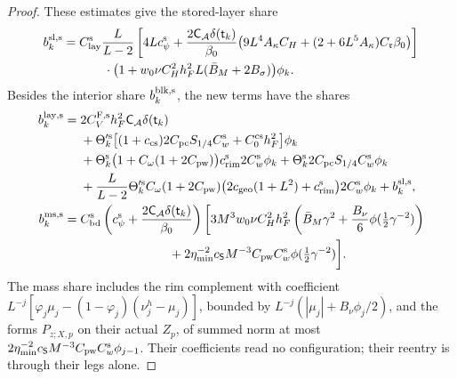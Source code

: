 \documentclass[11pt,letterpaper,reqno]{amsart}
\theoremstyle{definition}
\theoremstyle{remark}
\begin{document}
\begin{proof}
These estimates give the stored-layer share
\[
\begin{split}
 b_k^{\rm sl,s}={}&C_{\rm lay}^{\rm s}\frac L{L-2}
 \left[4Lc_\psi^{\rm s}
 +\frac{2\mathsf C_{\mathcal A}\delta(\mathsf t_k)}{\beta_0}
  \bigl(9L^4A_\kappa C_H+
           (2+6L^5A_\kappa)C_{\mathfrak r}\beta_0\bigr)\right]\\
 &\hspace{7mm}\cdot
 \bigl(1+w_0\nu C_H^2h_F^2L(\bar B_M+2B_\sigma)\bigr)\phi_k.
\end{split}
\]
Besides the interior share $b_k^{\rm blk,s}$, the new terms
have the shares
\[
\begin{split}
 b_k^{\rm lay,s}={}&2C_V^{\rm F,s}h_F^2\mathsf C_{\mathcal A}
                         \delta(\mathsf t_k)\\
 &+\Theta_k^{\prime\rm s}
   \bigl[(1+c_{\rm cs})2C_{\rm pc}S_{1/4}C_w^{\rm s}
                      +C_0^{\rm cs}h_F^2\bigr]\phi_k\\
 &+\Theta_k^{\rm s}\bigl(1+C_\omega(1+2C_{\rm pw})\bigr)
                     c_{\rm rim}^{\rm s}2C_w^{\rm s}\phi_k
       +\Theta_k^{\rm s}2C_{\rm pc}S_{1/4}C_w^{\rm s}\phi_k\\
 &+\frac L{L-2}\Theta_k^{\prime\rm s}C_\omega(1+2C_{\rm pw})
   \bigl(2c_{\rm geo}(1+L^2)+c_{\rm rim}^{\rm s}\bigr)
                     2C_w^{\rm s}\phi_k+b_k^{\rm sl,s},\\
 b_k^{\rm ms,s}={}&C_{\rm bd}^{\rm s}
       \left(c_\psi^{\rm s}
             +\frac{2\mathsf C_{\mathcal A}\delta(\mathsf t_k)}{\beta_0}\right)
  \bigg[3M^3w_0\nu C_H^2h_F^2
       \left(\bar B_M\gamma^2+\frac{B_\nu}6
                                   \phi(\tfrac12\gamma^{-2})\right)\\
 &\hspace{25mm}
     +2\eta_{\min}^{-2}c_{\mathsf S}M^{-3}C_{\rm pw}C_w^{\rm s}
                                   \phi(\tfrac12\gamma^{-2})\bigg].
\end{split}
\]
The mass share includes the rim complement with coefficient
$L^{-j}[\varphi_j\mu_j-(1-\varphi_j)(\nu_j^h-\mu_j)]$,
bounded by $L^{-j}(|\mu_j|+B_\nu\phi_j/2)$, and the forms
$P_{z;X,p}$ on their actual $Z_p$, of summed norm at most
$2\eta_{\min}^{-2}c_{\mathsf S}M^{-3}C_{\rm pw}C_w^{\rm s}
\phi_{j-1}$. Their coefficients read no configuration; their
reentry is through their legs alone.


\end{proof}
\end{document}
